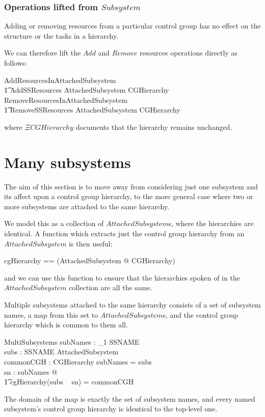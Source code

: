 \documentclass[a4paper,twoside,12pt]{article}
\begin{document}
\subsubsection{Operations lifted from $Subsystem$}

Adding or removing resources from a particular control group has no effect on the structure or the tasks
in a hierarchy.

We can therefore lift the $Add$ and $Remove$ resources operations directly as follows:

\begin{zed}
AddResourcesInAttachedSubsystem  \\
\t1 AddSSResources \land \Delta AttachedSubsystem \land \Xi CGHierarchy
\also
RemoveResourcesInAttachedSubsystem  \\
\t1 RemoveSSResources \land \Delta AttachedSubsystem \land \Xi CGHierarchy
\end{zed}
where $\Xi CGHierarchy$ documents that the hierarchy remains unchanged.

\section{Many subsystems}
\label{sec:manyss}

The aim of this section is to move away from considering just one subsystem and its affect upon
a control group hierarchy, to the more general case where two or more subsystems are attached
to the same hierarchy.

We model this as a collection of $AttachedSubsystem$s, where the hierarchies are identical.
A function which extracts just the control group hierarchy from an $AttachedSubsystem$ is then useful:
\begin{zed}
cgHierarchy == (\lambda AttachedSubsystem @ \theta CGHierarchy)
\end{zed}
and we can use this  function to ensure that the hierarchies spoken of in the $AttachedSubsystem$
collection are all the same.

Multiple subsystems attached to the same hierarchy consists of a set of subsystem names, a map from this set
to $AttachedSubsystem$s, and the control group hierarchy which is common to them all.
\begin{schema}{MultiSubsystems}
subNames : \finset_1 SSNAME \\
subs : SSNAME \ffun AttachedSubsystem \\
commonCGH : CGHierarchy
\where
subNames = \dom subs \\
\forall sn : subNames @ \\
    \t1 cgHierarchy(subs ~ sn) = commonCGH
\end{schema}
The domain of the map is exactly the set of subsystem names, and every named subsystem's
control group hierarchy is identical to the top-level one.
\end{document}
